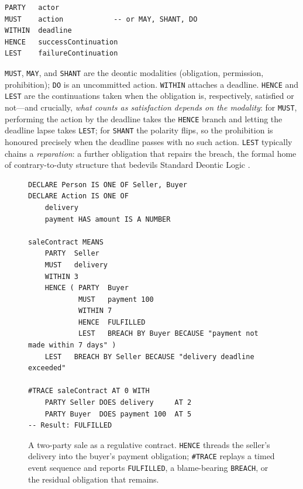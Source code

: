 \documentclass[sigconf,nonacm]{acmart}
\newcommand{\code}[1]{\texttt{\small #1}}
\begin{document}
\begin{lstlisting}
PARTY   actor
MUST    action            -- or MAY, SHANT, DO
WITHIN  deadline
HENCE   successContinuation
LEST    failureContinuation
\end{lstlisting}

\code{MUST}, \code{MAY}, and \code{SHANT} are the deontic modalities
(obligation, permission, prohibition); \code{DO} is an uncommitted
action. \code{WITHIN} attaches a deadline. \code{HENCE} and \code{LEST} are
the continuations taken when the obligation is, respectively, satisfied or
not---and crucially, \emph{what counts as satisfaction depends on the
modality}: for \code{MUST}, performing the action by the deadline takes the
\code{HENCE} branch and letting the deadline lapse takes \code{LEST}; for
\code{SHANT} the polarity flips, so the prohibition is honoured precisely
when the deadline passes with no such action. \code{LEST} typically chains a
\emph{reparation}: a further obligation that repairs the breach, the
formal home of contrary-to-duty structure that bedevils Standard Deontic
Logic \cite{chisholm1963ctd,vonwright1951deontic}.

\begin{figure}[t]
\begin{lstlisting}
DECLARE Person IS ONE OF Seller, Buyer
DECLARE Action IS ONE OF
    delivery
    payment HAS amount IS A NUMBER

saleContract MEANS
    PARTY  Seller
    MUST   delivery
    WITHIN 3
    HENCE ( PARTY  Buyer
            MUST   payment 100
            WITHIN 7
            HENCE  FULFILLED
            LEST   BREACH BY Buyer BECAUSE "payment not made within 7 days" )
    LEST   BREACH BY Seller BECAUSE "delivery deadline exceeded"

#TRACE saleContract AT 0 WITH
    PARTY Seller DOES delivery     AT 2
    PARTY Buyer  DOES payment 100  AT 5
-- Result: FULFILLED
\end{lstlisting}
\caption{A two-party sale as a regulative contract. \code{HENCE} threads the
seller's delivery into the buyer's payment obligation; \code{\#TRACE}
replays a timed event sequence and reports \code{FULFILLED}, a blame-bearing
\code{BREACH}, or the residual obligation that remains.}
\label{fig:sale}
\end{figure}
\end{document}
